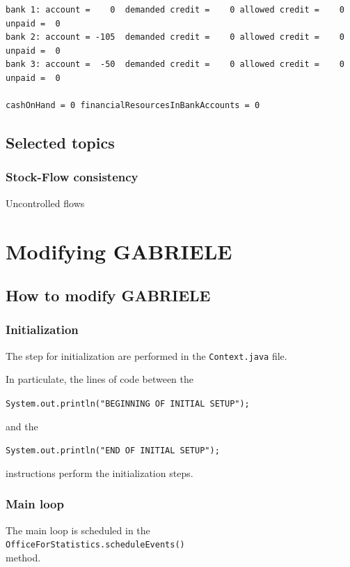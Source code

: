 \documentclass{book}
\begin{document}
\begin{verbatim}
bank 1: account =    0  demanded credit =    0 allowed credit =    0 unpaid =  0
bank 2: account = -105  demanded credit =    0 allowed credit =    0 unpaid =  0
bank 3: account =  -50  demanded credit =    0 allowed credit =    0 unpaid =  0

cashOnHand = 0 financialResourcesInBankAccounts = 0
\end{verbatim}

\chapter{Selected topics}

\section{Stock-Flow consistency}

Uncontrolled flows

\part{Modifying GABRIELE}

\chapter{How to modify GABRIELE}

\section{Initialization}
The step for initialization are performed in the \verb+Context.java+ file.

In particulate, the lines of code between the

\verb+System.out.println("BEGINNING OF INITIAL SETUP");+

and the

\verb+System.out.println("END OF INITIAL SETUP");+

instructions perform the initialization steps.


\section{Main loop}

The main loop is scheduled in the\\ \verb+OfficeForStatistics.scheduleEvents()+\\ method.
\end{document}

